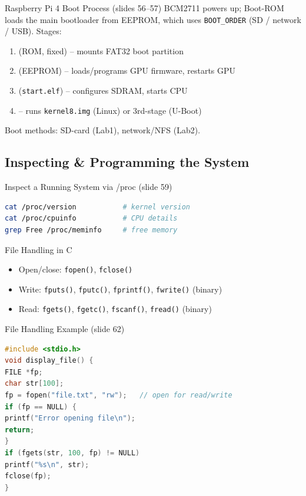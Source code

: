 \multend

\begin{corollary}{Raspberry Pi 4 Boot Process (slides 56--57)}
    BCM2711 powers up; Boot-ROM loads the main bootloader from EEPROM, which uses
    \texttt{BOOT\_ORDER} (SD / network / USB). Stages:
    \begin{enumerate}
        \item {} (ROM, fixed) -- mounts FAT32 boot partition
        \item {} (EEPROM) -- loads/programs GPU firmware, restarts GPU
        \item {} (\texttt{start.elf}) -- configures SDRAM, starts CPU
        \item {} -- runs \texttt{kernel8.img} (Linux) or 3rd-stage (U-Boot)
    \end{enumerate}
    Boot methods:  SD-card (Lab1),  network/NFS (Lab2).
\end{corollary}

\subsection{Inspecting \& Programming the System}

\begin{KR}{Inspect a Running System via /proc (slide 59)}
\begin{lstlisting}[language=bash, style=basesmol, aboveskip=2pt, belowskip=2pt]
cat /proc/version           # kernel version
cat /proc/cpuinfo           # CPU details
grep Free /proc/meminfo     # free memory
\end{lstlisting}
\end{KR}

\begin{definition}{File Handling in C}
    \begin{itemize}
        \item Open/close: \texttt{fopen()}, \texttt{fclose()}
        \item Write: \texttt{fputs()}, \texttt{fputc()}, \texttt{fprintf()}, \texttt{fwrite()} (binary)
        \item Read: \texttt{fgets()}, \texttt{fgetc()}, \texttt{fscanf()}, \texttt{fread()} (binary)
    \end{itemize}
\end{definition}

\begin{examplecode}{File Handling Example (slide 62)}
\begin{lstlisting}[language=C, style=basesmol, aboveskip=2pt, belowskip=2pt]
#include <stdio.h>
void display_file() {
FILE *fp;
char str[100];
fp = fopen("file.txt", "rw");   // open for read/write
if (fp == NULL) {
printf("Error opening file\n");
return;
}
if (fgets(str, 100, fp) != NULL)
printf("%s\n", str);
fclose(fp);
}
\end{lstlisting}
\end{examplecode}

